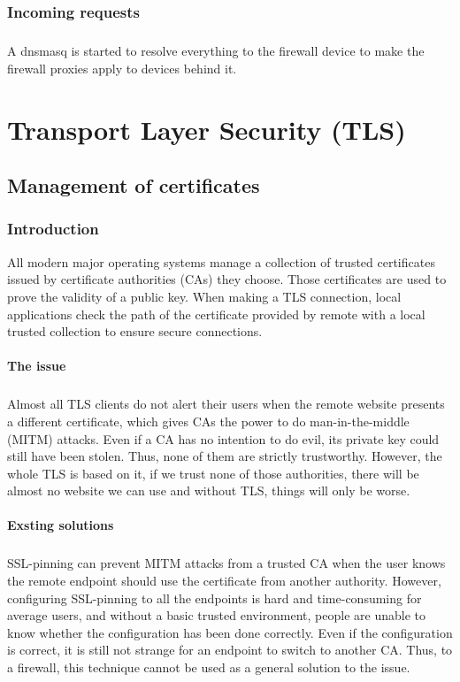 \documentclass[mscthesis]{usiinfthesis}
\begin{document}
\subsection{Incoming requests}
\paragraph{}
A dnsmasq is started to resolve everything to the firewall device to make the firewall proxies apply to devices behind it.

\chapter{Transport Layer Security (TLS)}

\section{Management of certificates}

\subsection{Introduction}
All modern major operating systems manage a collection of trusted certificates issued by certificate authorities (CAs) they choose. Those certificates are used to prove the validity of a public key. When making a TLS connection, local applications check the path of the certificate provided by remote with a local trusted collection to ensure secure connections.
\subsubsection{The issue}
\paragraph{}
Almost all TLS clients do not alert their users when the remote website presents a different certificate, which gives CAs the power to do man-in-the-middle (MITM) attacks. Even if a CA has no intention to do evil, its private key could still have been stolen. Thus, none of them are strictly trustworthy. However, the whole TLS is based on it, if we trust none of those authorities, there will be almost no website we can use and without TLS, things will only be worse.
\subsubsection{Exsting solutions}
\paragraph{}
SSL-pinning can prevent MITM attacks from a trusted CA when the user knows the remote endpoint should use the certificate from another authority. However, configuring SSL-pinning to all the endpoints is hard and time-consuming for average users, and without a basic trusted environment, people are unable to know whether the configuration has been done correctly. Even if the configuration is correct, it is still not strange for an endpoint to switch to another CA. Thus, to a firewall, this technique cannot be used as a general solution to the issue.
\end{document}
